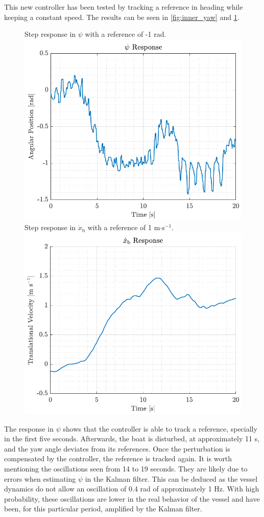 This new controller has been tested by tracking a reference in heading while keeping a constant speed. The results can be seen in \autoref{fig:inner_yaw} and \ref{fig:inner_xbdot}.
%
\begin{figure}[H]
    \captionbox 
    {   
        Step response in $\psi$ with a reference of -1 rad.
        \label{fig:inner_yaw}
    }                                                                 
    {                                                                  
        \includegraphics[width=.45\textwidth]{figures/inner_yaw}         
    }                                                                    
    \hspace{5pt}                                                          
    \captionbox  
    {      
        Step response in $\dot{x}_\mathrm{b}$ with a reference of 1 m$\cdot$s$^{-1}$.
        \label{fig:inner_xbdot}
    }                                                                          
    {
        \includegraphics[width=.45\textwidth]{figures/inner_xbdot}
    }
\end{figure}

The response in $\psi$ shows that the controller is able to track a reference, specially in the first five seconds. Afterwards, the boat is disturbed, at approximately 11 s, and the yaw angle deviates from its references. Once the perturbation is compensated by the controller, the reference is tracked again. It is worth mentioning the oscillations seen from 14 to 19 seconds. They are likely due to errors when estimating $\psi$ in the Kalman filter. This can be deduced as the vessel dynamics do not allow an oscillation of 0.4 rad of approximately 1 Hz. With high probability, these oscillations are lower in the real behavior of the vessel and have been, for this particular period, amplified by the Kalman filter.

